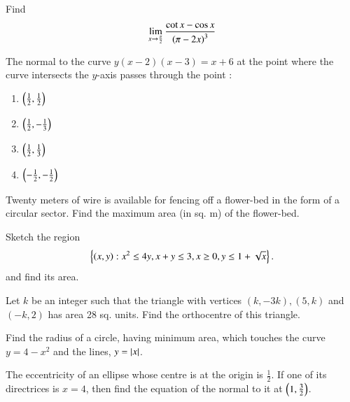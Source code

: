 \documentclass[journal,12pt,twocolumn]{IEEEtran}
\begin{document}
\begin{problem}
Find
\begin{equation}
\lim_{x \rightarrow \frac{\pi}{2}} \frac{\cot x - \cos x}{\left(\pi - 2x\right)^3}
\end{equation}
\end{problem}
\begin{problem}
 The normal to the curve $y(x-2)(x-
3)=x+6$ at the point where the curve intersects the
$y$-axis passes
 through the point :
\begin{enumerate}
\item $\left(\frac{1}{{2}}, \frac{1}{{2}}\right)$
\item $\left(\frac{1}{{2}}, -\frac{1}{{3}}\right)$
\item $\left(\frac{1}{{2}}, \frac{1}{{3}}\right)$
\item $\left(-\frac{1}{{2}}, -\frac{1}{{2}}\right)$
\end{enumerate}
\end{problem}
%
\begin{problem}
Twenty meters of wire is available for
fencing off a flower-bed in the form of a circular
sector. Find the maximum area (in sq. m) of the
flower-bed.
\end{problem}
%
\begin{problem}
Sketch the 
region
%
\begin{equation}
\left\{\left(x,y\right):  x^2 	\le 4y,x + y \le 3, x  \ge 0, y \le 1 + \sqrt{x}\right\}.
\end{equation}
%
and find its area.
\end{problem}

%
\begin{problem}
Let $k$ be an integer such that the
triangle with vertices $(k, -3k), (5, k)$ and $(-k, 2)$
has area 28 sq. units. Find the orthocentre of this
triangle.
\end{problem}
%
\begin{problem}
Find the radius of a circle, having minimum
area, which touches the curve $y=4−x^2$
and the lines, $y=\left\vert x\right\vert$.	
\end{problem}
\begin{problem}
The eccentricity of an ellipse whose
centre is at the origin is $\frac{1}{2}$. If one of its directrices
is $x=4$,
then find the equation of the normal to it at
$\left(1,\frac{3}{2}\right)$.
\end{problem}
%
%
%
\end{document}
